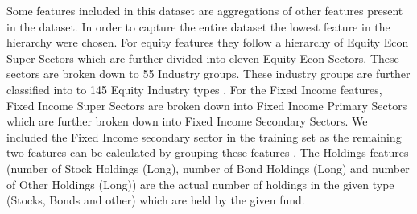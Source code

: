 \documentclass[sigconf]{acmart}
\begin{document}
Some features included in this dataset are aggregations of other features present in the dataset. In order to capture the entire dataset the lowest feature in the hierarchy were chosen. For equity features they follow a hierarchy of Equity Econ Super Sectors which are further divided into eleven Equity Econ Sectors. These sectors are broken down to 55 Industry groups. These industry groups are further classified into to 145 Equity Industry types \cite{morningstarequitysectorbreakdown}. For the Fixed Income features, Fixed Income Super Sectors are broken down into Fixed Income Primary Sectors which are further broken down into Fixed Income Secondary Sectors. We included the Fixed Income secondary sector in the training set as the remaining two features can be calculated by grouping these features \cite{morningstarfixedincomeclassificationreakdown}. The Holdings features (number of Stock Holdings (Long), number of Bond Holdings (Long) and number of Other Holdings (Long)) are the actual number of holdings in the given type (Stocks, Bonds and other) which are held by the given fund.
\end{document}
